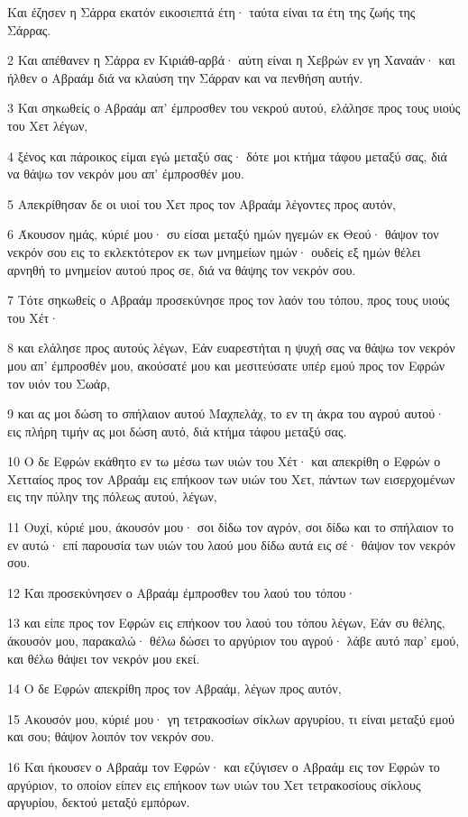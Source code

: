 \par Και έζησεν η Σάρρα εκατόν εικοσιεπτά έτη· ταύτα είναι τα έτη της ζωής της Σάρρας.
\par 2 Και απέθανεν η Σάρρα εν Κιριάθ-αρβά· αύτη είναι η Χεβρών εν γη Χαναάν· και ήλθεν ο Αβραάμ διά να κλαύση την Σάρραν και να πενθήση αυτήν.
\par 3 Και σηκωθείς ο Αβραάμ απ' έμπροσθεν του νεκρού αυτού, ελάλησε προς τους υιούς του Χετ λέγων,
\par 4 ξένος και πάροικος είμαι εγώ μεταξύ σας· δότε μοι κτήμα τάφου μεταξύ σας, διά να θάψω τον νεκρόν μου απ' έμπροσθέν μου.
\par 5 Απεκρίθησαν δε οι υιοί του Χετ προς τον Αβραάμ λέγοντες προς αυτόν,
\par 6 Άκουσον ημάς, κύριέ μου· συ είσαι μεταξύ ημών ηγεμών εκ Θεού· θάψον τον νεκρόν σου εις το εκλεκτότερον εκ των μνημείων ημών· ουδείς εξ ημών θέλει αρνηθή το μνημείον αυτού προς σε, διά να θάψης τον νεκρόν σου.
\par 7 Τότε σηκωθείς ο Αβραάμ προσεκύνησε προς τον λαόν του τόπου, προς τους υιούς του Χέτ·
\par 8 και ελάλησε προς αυτούς λέγων, Εάν ευαρεστήται η ψυχή σας να θάψω τον νεκρόν μου απ' έμπροσθέν μου, ακούσατέ μου και μεσιτεύσατε υπέρ εμού προς τον Εφρών τον υιόν του Σωάρ,
\par 9 και ας μοι δώση το σπήλαιον αυτού Μαχπελάχ, το εν τη άκρα του αγρού αυτού· εις πλήρη τιμήν ας μοι δώση αυτό, διά κτήμα τάφου μεταξύ σας.
\par 10 Ο δε Εφρών εκάθητο εν τω μέσω των υιών του Χέτ· και απεκρίθη ο Εφρών ο Χετταίος προς τον Αβραάμ εις επήκοον των υιών του Χετ, πάντων των εισερχομένων εις την πύλην της πόλεως αυτού, λέγων,
\par 11 Ουχί, κύριέ μου, άκουσόν μου· σοι δίδω τον αγρόν, σοι δίδω και το σπήλαιον το εν αυτώ· επί παρουσία των υιών του λαού μου δίδω αυτά εις σέ· θάψον τον νεκρόν σου.
\par 12 Και προσεκύνησεν ο Αβραάμ έμπροσθεν του λαού του τόπου·
\par 13 και είπε προς τον Εφρών εις επήκοον του λαού του τόπου λέγων, Εάν συ θέλης, άκουσόν μου, παρακαλώ· θέλω δώσει το αργύριον του αγρού· λάβε αυτό παρ' εμού, και θέλω θάψει τον νεκρόν μου εκεί.
\par 14 Ο δε Εφρών απεκρίθη προς τον Αβραάμ, λέγων προς αυτόν,
\par 15 Ακουσόν μου, κύριέ μου· γη τετρακοσίων σίκλων αργυρίου, τι είναι μεταξύ εμού και σου; θάψον λοιπόν τον νεκρόν σου.
\par 16 Και ήκουσεν ο Αβραάμ τον Εφρών· και εζύγισεν ο Αβραάμ εις τον Εφρών το αργύριον, το οποίον είπεν εις επήκοον των υιών του Χετ τετρακοσίους σίκλους αργυρίου, δεκτού μεταξύ εμπόρων.
